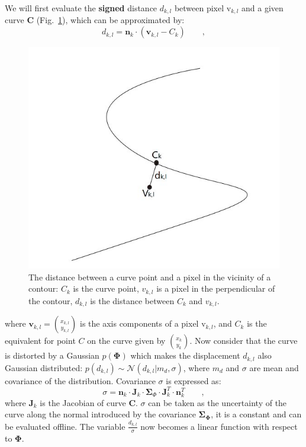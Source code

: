 \documentclass[conference]{IEEEtran}
\begin{document}
We will first evaluate the \textbf{signed} distance $d_{k,l}$ between pixel
$\mathrm{v}_{k,l}$ and a given curve $\mathbf{C}$
(Fig.~\ref{fig:dis}), which
can be approximated by:
\begin{equation}
  \label{eq:dis}
  d_{k,l} = \mathbf{n}_k \cdot ( \mathbf{v}_{k,l} - C_k)\qquad,
\end{equation}

\begin{figure}[htbp]
  \centering
  \includegraphics[width=\columnwidth]{images/dis.jpg}
  \caption{The distance between a curve point and a pixel in the
    vicinity of a contour: $C_k$ is the curve point, $v_{k,l}$ is a
    pixel in the perpendicular of the contour, $d_{k,l}$ is the
    distance between $C_k$ and $v_{k,l}$.}
  \label{fig:dis}
\end{figure}

where $\mathbf{v}_{k,l} = {x_{k,l} \choose y_{k,l}}$ is the axis
components of a pixel
$\mathrm{v}_{k,l}$, and $C_k$ is the equivalent for point $C$ on the
curve given by ${x_k \choose y_k}$. Now consider that the curve is
distorted by a Gaussian $p(\mathbf{\Phi})$ which makes the displacement $d_{k,l}$ also Gaussian distributed: $p(d_{k,l}) \sim
\mathcal{N}(d_{k,l}|m_d, \sigma)$, where $m_d$ and $\sigma$ are mean
and covariance of the distribution. Covariance $\sigma$ is expressed as:
\begin{equation}
  \label{eq:cov}
  \sigma = \mathbf{n}_k \cdot \mathbf{J}_k \cdot \mathbf{\Sigma}_{\Phi}
  \cdot \mathbf{J}_k^T \cdot \mathbf{n}_k^T\qquad,
\end{equation}
where $\mathbf{J}_k$ is the Jacobian of curve $\mathbf{C}$. $\sigma$
can be taken as the uncertainty of the curve along the normal
introduced by the covariance
$\mathbf{\Sigma}_{\mathbf{\Phi}}$, it is a constant and can be
evaluated offline. The variable
$\frac{d_{k,l}}{\sigma}$ now becomes a linear function with respect to $\mathbf{\Phi}$.
\end{document}
